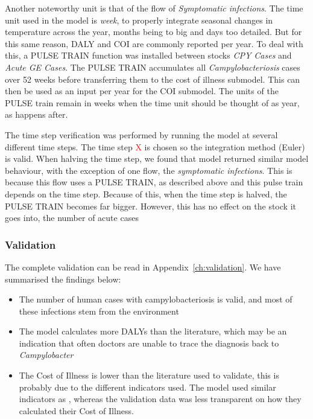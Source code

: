 Another noteworthy unit is that of the flow of \textit{Symptomatic infections}. The time unit used in the model is \textit{week}, to properly integrate seasonal changes in temperature across the year, months being to big and days too detailed. But for this same reason, DALY and COI are commonly reported per year. To deal with this, a PULSE TRAIN function was installed between stocks \textit{CPY Cases} and \textit{Acute GE Cases}. The PULSE TRAIN accumulates all \textit{Campylobacteriosis} cases over 52 weeks before transferring them to the cost of illness submodel. This can then be used as an input per year for the COI submodel. The units of the PULSE train remain in weeks when the time unit should be thought of as year, as happens after. 
    
The time step verification was performed by running the model at several different time steps. The time step \textcolor{red}{X} is chosen so the integration method (Euler) is valid. When halving the time step, we found that model returned similar model behaviour, with the exception of one flow, the \textit{symptomatic infections}. This is because this flow uses a PULSE TRAIN, as described above and this pulse train depends on the time step. Because of this, when the time step is halved, the PULSE TRAIN becomes far bigger. However, this has no effect on the stock it goes into, the number of acute cases 


\subsubsection{Validation}    


The complete validation can be read in Appendix~\ref{ch:validation}. We have summarised the findings below:

\begin{itemize}
    \item The number of human cases with campylobacteriosis is valid, and most of these infections stem from the environment
    \item The model calculates more DALYs than the literature, which may be an indication that often doctors are unable to trace the diagnosis back to \textit{Campylobacter}
    \item The Cost of Illness is lower than the literature used to validate, this is probably due to the different indicators used. The model used similar indicators as \textcite{mangen_campylobacteriosis_2007}, whereas the validation data was less transparent on how they calculated their Cost of Illness.
\end{itemize}

